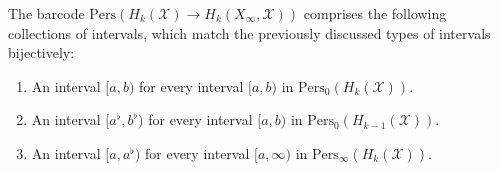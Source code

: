 \begin{corollary}{\cite[Proposition 2.5]{de2011dualities}}
The barcode $\mathrm{Pers}(H_{k}(\mathcal{X}) \rightarrow H_{k}(X_{\infty}, \mathcal{X}))$ comprises the following collections of intervals, which match the previously discussed types of intervals bijectively:
\begin{enumerate}
    \item An interval $[a, b)$ for every interval $[a, b)$ in $\mathrm{Pers}_{0}(H_{k}(\mathcal{X}))$.
    \item An interval $[a^{\flat}, b^{\flat})$ for every interval $[a, b)$ in $\mathrm{Pers}_{0}(H_{k-1}(\mathcal{X}))$.
    \item An interval $[a, a^{\flat})$ for every interval $[a, \infty)$ in $\mathrm{Pers}_{\infty}(H_{k}(\mathcal{X}))$.
\end{enumerate}
\end{corollary}

